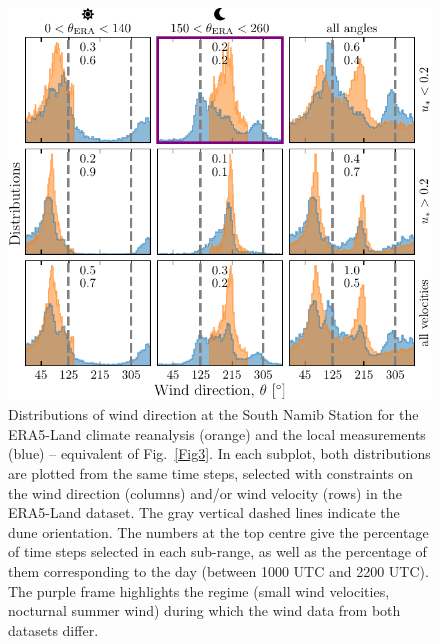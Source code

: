 \begin{figure}[p]
\centering
\includegraphics[scale=1]{Figures/Figure6_supp.pdf}
\caption{Distributions of wind direction at the South Namib Station for the ERA5-Land climate reanalysis (orange) and the local measurements (blue) -- equivalent of Fig.~\ref{Fig3}. In each subplot, both distributions are plotted from the same time steps, selected with constraints on the wind direction (columns) and/or wind velocity (rows) in the ERA5-Land dataset. The gray vertical dashed lines indicate the dune orientation. The numbers at the top centre give the percentage of time steps selected in each sub-range, as well as the percentage of them corresponding to the day (between 1000 UTC and 2200 UTC). The purple frame highlights the regime (small wind velocities, nocturnal summer wind) during which the wind data from both datasets differ.}
\label{Fig6_supp}
\end{figure}

